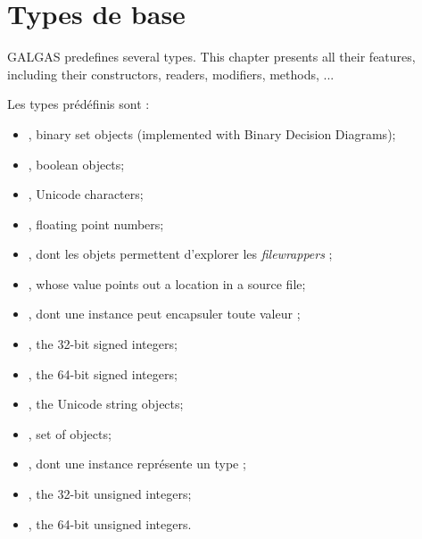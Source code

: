 
\chapter{Types de base}\label{predefinedTypes}

GALGAS predefines several types. This chapter presents all their features, including their constructors, readers, modifiers, methods, ...


Les types prédéfinis sont :
\begin{itemize}
\item {}, binary set objects (implemented with Binary Decision Diagrams);
\item {}, boolean objects;
\item {}, Unicode characters;
\item {}, floating point numbers;
\item {}, dont les objets permettent d'explorer les \emph{filewrappers} ;
\item {}, whose value points out a location in a source file;
\item {}, dont une instance peut encapsuler toute valeur ;
\item {}, the 32-bit signed integers;
\item {}, the 64-bit signed integers;
\item {}, the Unicode string objects;
\item {}, set of  objects;
\item {}, dont une instance représente un type ;
\item {}, the 32-bit unsigned integers;
\item {}, the 64-bit unsigned integers.
\end{itemize}

